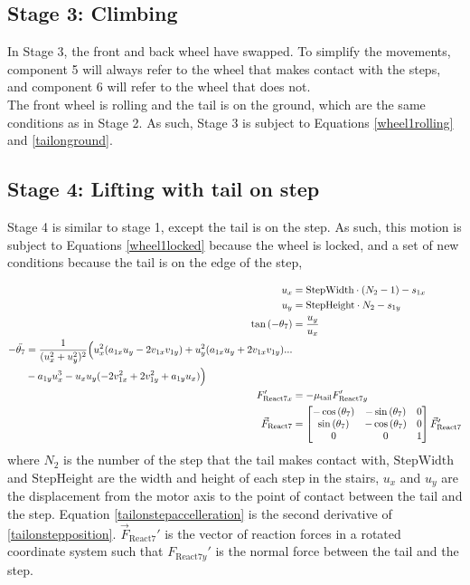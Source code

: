 \subsection*{Stage 3: Climbing}

In Stage 3, the front and back wheel have swapped. To simplify the movements, component 5 will always refer to the wheel that makes contact with the steps, and component 6 will refer to the wheel that does not. \\
The front wheel is rolling and the tail is on the ground, which are the same conditions as in Stage 2. As such, Stage 3 is subject to Equations \ref{wheel1rolling} and \ref{tailonground}.

\subsection*{Stage 4: Lifting with tail on step}
Stage 4 is similar to stage 1, except the tail is on the step. As such, this motion is subject to Equations \ref{wheel1locked} because the wheel is locked, and a set of new conditions because the tail is on the edge of the step,

\begin{subequations}
	\label{tailonstep}
	\begin{align}
		u_x &= \mathrm{StepWidth}\cdot (N_2-1)- s_{1x}\\
		u_y &= \mathrm{StepHeight}\cdot N_2 - s_{1y}\\
		\tan{(-\theta_7)} &= \frac{u_y}{u_x}\label{tailonstepposition}\\
		\begin{split}
		-\ddot{\theta_7} &= \frac{1}
		{(u_x^2 + u_y^2)^2}
		\Big( u_x^2 (a_{1x} u_y  - 2 v_{1x} v_{1y})
		+ u_y^2 (a_{1x} u_y + 2  v_{1x}  v_{1y}  )  \space ...\\
		&-  a_{1y} u_x^3 
		- u_x  u_y  (- 2  v_{1x}^2 + 2 v_{1y}^2 + a_{1y} u_x  )\Big)
		\end{split}
		\label{tailonstepaccelleration}\\
		F_{\mathrm{React}7x}' &= -\mu_{\mathrm{tail}} F_{\mathrm{React}7y}'\\
		\vec{F}_{\mathrm{React}7} &= \begin{bmatrix}
			-\cos{(\theta_7)} & -\sin{(\theta_7)} & 0\\
			\sin{(\theta_7)} & -\cos{(\theta_7)} & 0\\
			0 & 0 & 1
		\end{bmatrix} \vec{F}_{\mathrm{React}7}'
	\end{align}
\end{subequations}
where $N_2$ is the number of the step that the tail makes contact with, $\mathrm{StepWidth}$ and $\mathrm{StepHeight}$ are the width and height of each step in the stairs, $u_x$ and $u_y$ are the displacement from the motor axis to the point of contact between the tail and the step. Equation \ref{tailonstepaccelleration} is the second derivative of \ref{tailonstepposition}. $\vec{F}_{\mathrm{React}7}'$ is the vector of reaction forces in a rotated coordinate system such that $F_{\mathrm{React}7y}'$ is the normal force between the tail and the step.

